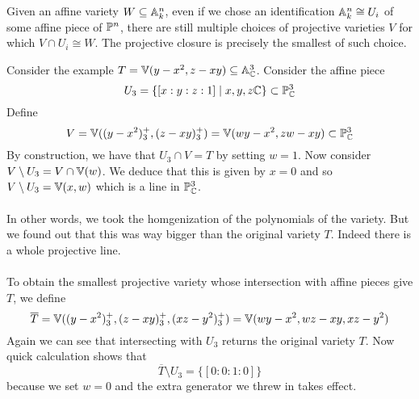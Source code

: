 \documentclass[a4paper]{article}
\begin{document}
Given an affine variety $W\subseteq\mathbb{A}_k^n$, even if we chose an identification $\mathbb{A}_k^n\cong U_i$ of some affine piece of $\mathbb{P}^n$, there are still multiple choices of projective varieties $V$ for which $V\cap U_i\cong W$. The projective closure is precisely the smallest of such choice. 

\begin{eg}{}{} Consider the example $T=\mathbb{V}(y-x^2,z-xy)\subseteq\mathbb{A}_{\mathbb{C}}^3$. Consider the affine piece $$U_3=\{[x:y:z:1]\;|\;x,y,z\mathbb{C}\}\subset\mathbb{P}_{\mathbb{C}}^3$$ Define $$V=\mathbb{V}((y-x^2)_3^+,(z-xy)_3^+)=\mathbb{V}(wy-x^2,zw-xy)\subset\mathbb{P}_{\mathbb{C}}^3$$ By construction, we have that $U_3\cap V=T$ by setting $w=1$. Now consider $V\setminus U_3=V\cap\mathbb{V}(w)$. We deduce that this is given by $x=0$ and so $V\setminus U_3=\mathbb{V}(x,w)$ which is a line in $\mathbb{P}_{\mathbb{C}}^3$. \\~\\

In other words, we took the homgenization of the polynomials of the variety. But we found out that this was way bigger than the original variety $T$. Indeed there is a whole projective line. \\~\\

To obtain the smallest projective variety whose intersection with affine pieces give $T$, we define $$\overline{T}=\mathbb{V}((y-x^2)_3^+,(z-xy)_3^+,(xz-y^2)_3^+)=\mathbb{V}(wy-x^2,wz-xy,xz-y^2)$$ Again we can see that intersecting with $U_3$ returns the original variety $T$. Now quick calculation shows that $$\overline{T}\setminus U_3=\{[0:0:1:0]\}$$ because we set $w=0$ and the extra generator we threw in takes effect. 
\end{eg}
\end{document}
